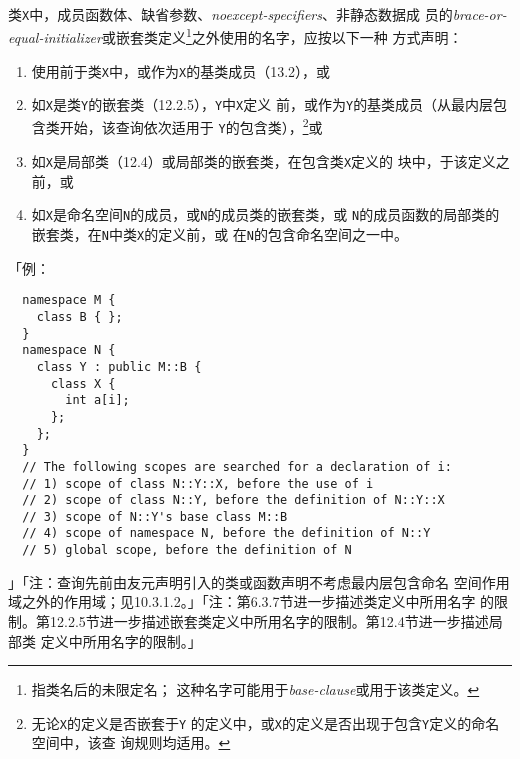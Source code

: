 \paragraph{}
类\texttt{X}中，成员函数体、缺省参数、\textit{noexcept-specifiers}、非静态数据成
员的\textit{brace-or-equal-initializer}或嵌套类定义\footnote{指类名后的未限定名；
这种名字可能用于\textit{base-clause}或用于该类定义。}之外使用的名字，应按以下一种
方式声明：
\begin{enumerate}
  \item{使用前于类\texttt{X}中，或作为\texttt{X}的基类成员（13.2），或}
  \item{如\texttt{X}是类\texttt{Y}的嵌套类（12.2.5），\texttt{Y}中\texttt{X}定义
    前，或作为\texttt{Y}的基类成员（从最内层包含类开始，该查询依次适用于
    \texttt{Y}的包含类），\footnote{无论\texttt{X}的定义是否嵌套于\texttt{Y}
    的定义中，或\texttt{X}的定义是否出现于包含\texttt{Y}定义的命名空间中，该查
    询规则均适用。}或}
  \item{如\texttt{X}是局部类（12.4）或局部类的嵌套类，在包含类\texttt{X}定义的
    块中，于该定义之前，或}
  \item{如\texttt{X}是命名空间\texttt{N}的成员，或\texttt{N}的成员类的嵌套类，或
    \texttt{N}的成员函数的局部类的嵌套类，在\texttt{N}中类\texttt{X}的定义前，或
    在\texttt{N}的包含命名空间之一中。}
\end{enumerate}
「例：
\begin{lstlisting}
  namespace M {
    class B { };
  }
  namespace N {
    class Y : public M::B {
      class X {
        int a[i];
      };
    };
  }
  // The following scopes are searched for a declaration of i:
  // 1) scope of class N::Y::X, before the use of i
  // 2) scope of class N::Y, before the definition of N::Y::X
  // 3) scope of N::Y's base class M::B
  // 4) scope of namespace N, before the definition of N::Y
  // 5) global scope, before the definition of N
\end{lstlisting}」「注：查询先前由友元声明引入的类或函数声明不考虑最内层包含命名
空间作用域之外的作用域；见10.3.1.2。」「注：第6.3.7节进一步描述类定义中所用名字
的限制。第12.2.5节进一步描述嵌套类定义中所用名字的限制。第12.4节进一步描述局部类
定义中所用名字的限制。」

